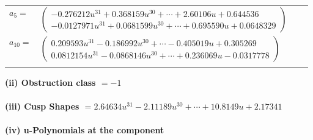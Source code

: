 \documentclass[1p]{elsarticle_modified}
\theoremstyle{definition}
\begin{document}
\begin{tabular}{m{7pt} m{180pt} m{7pt} m{180pt} }
\flushright $a_{5}=$&$\begin{pmatrix}-0.276212 u^{31}+0.368159 u^{30}+\cdots+2.60106 u+0.644536\\-0.0127971 u^{31}+0.0681599 u^{30}+\cdots+0.695590 u+0.0648329\end{pmatrix}$ \\
\flushright $a_{10}=$&$\begin{pmatrix}0.209593 u^{31}-0.186992 u^{30}+\cdots-0.405019 u+0.305269\\0.0812154 u^{31}-0.0868146 u^{30}+\cdots+0.236069 u-0.0317778\end{pmatrix}$\\&\end{tabular}
\flushleft \textbf{(ii) Obstruction class $= -1$}\\~\\
\flushleft \textbf{(iii) Cusp Shapes $= 2.64634 u^{31}-2.11189 u^{30}+\cdots+10.8149 u+2.17341$}\\~\\
\newpage\renewcommand{\arraystretch}{1}
\flushleft \textbf{(iv) u-Polynomials at the component}\newline \\
\end{document}
